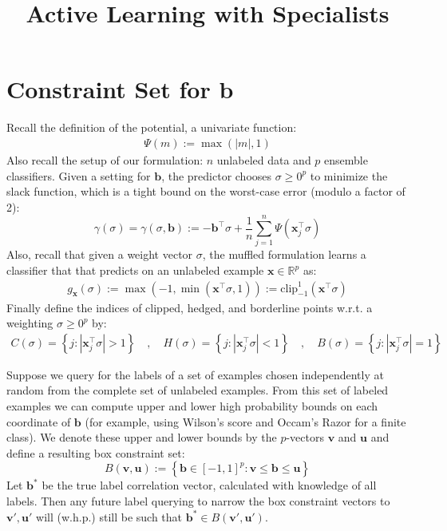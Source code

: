 \documentclass{article}
\title{Active Learning with Specialists}
\newcommand{\vx}{\mathbf{x}}
\newcommand{\vb}{\mathbf{b}}
\newcommand{\vu}{\mathbf{u}}
\newcommand{\vv}{\mathbf{v}}
\newcommand{\RR}{\mathbb{R}}      %
\newcommand{\abs}[1]{\left| #1 \right|}
\newcommand{\lrsetb}[1]{\left\{#1\right\}}
\begin{document}
\maketitle

\section{Constraint Set for $\vb$}


Recall the definition of the potential, a univariate function: 
\begin{align*}
\Psi (m) := \max (\abs{m}, 1)
\end{align*}
Also recall the setup of our formulation: $n$ unlabeled data and $p$ ensemble classifiers. 
Given a setting for $\vb$, the predictor chooses $\sigma \geq 0^p$ to minimize
the slack function, which is a tight bound on the worst-case error (modulo a factor of 2):
$$ \gamma (\sigma) = \gamma (\sigma,\vb) := - \vb^\top \sigma + \frac{1}{n}
\sum_{j=1}^n \Psi ( \vx_{j}^\top \sigma ) $$
Also, recall that given a weight vector $\sigma$, 
the muffled formulation learns a classifier that that predicts on an unlabeled example $\vx \in \RR^p$ as: 
\begin{align*}
g_{\vx} (\sigma) := \max( -1, \min (\vx^\top \sigma , 1) ) := \mbox{clip}_{-1}^{1} (\vx^\top \sigma)
\end{align*}
Finally define the indices of clipped, hedged, and borderline points w.r.t. a weighting $\sigma \geq 0^p$ by: 
\begin{align*}
C (\sigma) = \lrsetb{j : \abs{\vx_{j}^\top \sigma} > 1}
\quad , \quad
H (\sigma) = \lrsetb{j : \abs{\vx_{j}^\top \sigma} < 1}
\quad , \quad
B (\sigma) = \lrsetb{j : \abs{\vx_{j}^\top \sigma} = 1}
\end{align*}

Suppose we query for the labels of a set of examples
chosen independently at random from the complete set of unlabeled examples. 
From this set of labeled examples we can compute upper and lower high
probability bounds on each coordinate of $\vb$ (for example, using Wilson's score and Occam's Razor for a finite class). 
We denote these upper and lower bounds by the $p$-vectors $\vv$ and $\vu$ and define a resulting box constraint set:
\[
B (\vv,\vu) := \lrsetb{ \vb \in [-1,1]^p : \vv \leq \vb \leq \vu}
\]
Let $\vb^*$ be the true label correlation vector, calculated with knowledge of all labels. 
Then any future label querying to narrow the box constraint vectors to $\vv', \vu'$ will (w.h.p.) 
still be such that $\vb^* \in B (\vv', \vu')$. 
\end{document}
